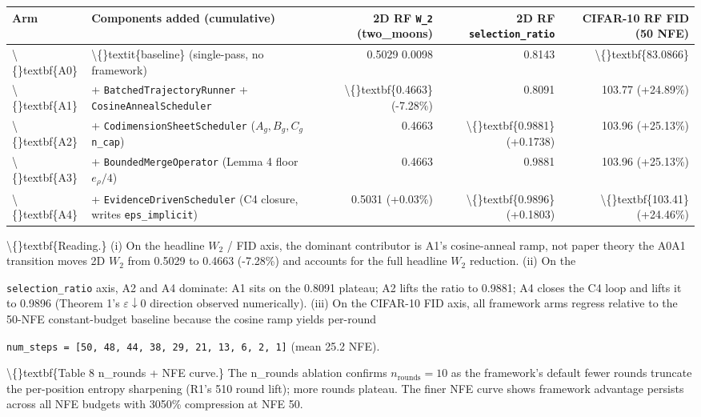 \documentclass[preprint,3p,times,twocolumn]{elsarticle}
\begin{document}
\begin{table}[ht]
\centering
\small
\begin{tabular}{llrrr}
\hline
\textbf{Arm} & \textbf{Components added (cumulative)} & \textbf{2D RF \texttt{W\_2} (two\_moons)} & \textbf{2D RF \texttt{selection\_ratio}} & \textbf{CIFAR-10 RF FID (50 NFE)} \\
\hline
\textbackslash\{\}textbf\{A0\} & \textbackslash\{\}textit\{baseline\} (single-pass, no framework) & 0.5029  0.0098 & 0.8143 & \textbackslash\{\}textbf\{83.0866\} \\
\textbackslash\{\}textbf\{A1\} & + \texttt{BatchedTrajectoryRunner} + \texttt{CosineAnnealScheduler} & \textbackslash\{\}textbf\{0.4663\} (-7.28\%) & 0.8091 & 103.77 (+24.89\%) \\
\textbackslash\{\}textbf\{A2\} & + \texttt{CodimensionSheetScheduler} ($A_g, B_g, C_g$  \texttt{n\_cap}) & 0.4663 & \textbackslash\{\}textbf\{0.9881\} (+0.1738) & 103.96 (+25.13\%) \\
\textbackslash\{\}textbf\{A3\} & + \texttt{BoundedMergeOperator} (Lemma 4 floor $e_\rho/4$) & 0.4663 & 0.9881 & 103.96 (+25.13\%) \\
\textbackslash\{\}textbf\{A4\} & + \texttt{EvidenceDrivenScheduler} (C4 closure, writes \texttt{eps\_implicit}) & 0.5031 (+0.03\%) & \textbackslash\{\}textbf\{0.9896\} (+0.1803) & \textbackslash\{\}textbf\{103.41\} (+24.46\%) \\
\hline
\end{tabular}
\end{table}

\textbackslash\{\}textbf\{Reading.\} (i) On the headline $W_2$ / FID axis, the dominant contributor is A1's cosine-anneal ramp, not paper theory  the A0A1 transition moves 2D $W_2$ from 0.5029 to 0.4663 (-7.28\%) and accounts for the full headline $W_2$ reduction. (ii) On the

\texttt{selection\_ratio} axis, A2 and A4 dominate: A1 sits on the 0.8091 plateau; A2 lifts the ratio to 0.9881; A4 closes the C4 loop and lifts it to 0.9896 (Theorem 1's $\varepsilon \downarrow 0$ direction observed numerically). (iii) On the CIFAR-10 FID axis, all framework arms regress relative to the 50-NFE constant-budget baseline because the cosine ramp yields per-round

\texttt{num\_steps = [50, 48, 44, 38, 29, 21, 13, 6, 2, 1]} (mean 25.2 NFE).

\textbackslash\{\}textbf\{Table 8  n\_rounds + NFE curve.\} The n\_rounds ablation confirms $n_\mathrm{rounds} = 10$ as the framework's default  fewer rounds truncate the per-position entropy sharpening (R1's 510 round lift); more rounds plateau. The finer NFE curve shows framework advantage persists across all NFE budgets with 3050\% compression at NFE  50.
\end{document}
